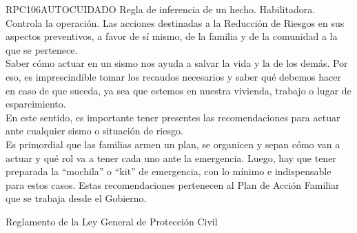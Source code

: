 \begin{BusinessRule}{RPC106}{AUTOCUIDADO}{
		Regla de inferencia de un hecho.
	}{
		Habilitadora. 
	}{
		Controla la operación. %
	}
	\BRItem[Descripción:] Las acciones destinadas a la Reducción de Riesgos en sus aspectos preventivos, a favor de sí mismo, de la familia y de la comunidad a la que se pertenece.
	\\Saber cómo actuar en un sismo nos ayuda a salvar la vida y la de los demás. Por eso, es imprescindible tomar los recaudos necesarios y saber qué debemos hacer en caso de que suceda, ya sea que estemos en nuestra vivienda, trabajo o lugar de esparcimiento.\\En este sentido, es importante tener presentes las recomendaciones para actuar ante cualquier sismo o situación de riesgo.\\Es primordial que las familias armen un plan, se organicen y sepan cómo van a actuar y qué rol va a tener cada uno ante la emergencia. Luego, hay que tener preparada la “mochila” o “kit” de emergencia, con lo mínimo e indispensable para estos casos. Estas recomendaciones pertenecen al Plan de Acción Familiar que se trabaja desde el Gobierno.
	
	
	 Reglamento de la Ley General de Protección Civil
\end{BusinessRule}